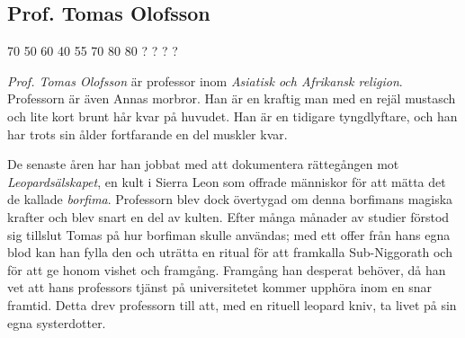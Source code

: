 \subsection{Prof. Tomas Olofsson}
\label{kar:TomasOlofsson}
\character
{70}	%
{50}	%
{60}	%
{40}	%
{55}	%
{70}	%
{80}	%
{80}	%
{?}	%
{?}		%
{?}		%
{?}		%
%
{
}
%
{
\textit{Prof. Tomas Olofsson} är professor inom \textit{Asiatisk och Afrikansk religion}. Professorn är även Annas morbror. Han är en kraftig man med en rejäl mustasch och lite kort brunt hår kvar på huvudet. Han är en tidigare tyngdlyftare, och han har trots sin ålder fortfarande en del muskler kvar.

De senaste åren har han jobbat med att dokumentera rättegången mot \textit{Leopardsälskapet}, en kult i Sierra Leon som offrade människor för att mätta det de kallade \textit{borfima}. Professorn blev dock övertygad om denna borfimans magiska krafter och blev snart en del av kulten. Efter många månader av studier förstod sig tillslut Tomas på hur borfiman skulle användas; med ett offer från hans egna blod kan han fylla den och uträtta en ritual för att framkalla Sub-Niggorath och för att ge honom vishet och framgång. Framgång han desperat behöver, då han vet att hans professors tjänst på universitetet kommer upphöra inom en snar framtid. Detta drev professorn till att, med en rituell leopard kniv, ta livet på sin egna systerdotter.
}
%
